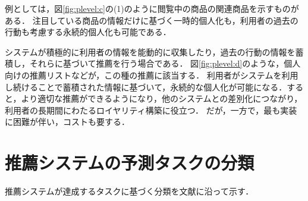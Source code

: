 \begin{description}[style=nextline]
例としては，図\ref{fig:plevel:c}の(1)のように閲覧中の商品の関連商品を示すものがある．
注目している商品の情報だけに基づく一時的個人化も，利用者の過去の行動も考慮する永続的個人化も可能である．
\item[緊密な個人化 (deep personalization)]
システムが積極的に利用者の情報を能動的に収集したり，過去の行動の情報を蓄積し，それらに基づいて推薦を行う場合である．
図\ref{fig:plevel:d}のような，個人向けの推薦リストなどが，この種の推薦に該当する．
利用者がシステムを利用し続けることで蓄積された情報に基づいて，永続的な個人化が可能になる．すると，より適切な推薦ができるようになり，他のシステムとの差別化につながり，利用者の長期間にわたるロイヤリティ構築に役立つ．
だが，一方で，最も実装に困難が伴い，コストも要する．
\end{description}

\section{推薦システムの予測タスクの分類}
\label{sec:recomtask}

推薦システムが達成するタスクに基づく分類を文献\cite{jacm:04:01,jmlr:09:01}に沿って示す．

